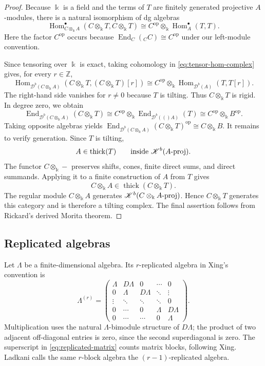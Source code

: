 \documentclass[12pt,a4paper,english,reqno]{amsart}
\theoremstyle{plain}
\theoremstyle{definition}
\newcommand{\kk}{\Bbbk}
\newcommand{\Hom}{\operatorname{Hom}}
\newcommand{\End}{\operatorname{End}}
\newcommand{\thick}{\operatorname{thick}}
\newcommand{\op}{\mathrm{op}}
\newcommand{\Db}[1]{{\mathscr D}^b(#1)}
\newcommand{\pmodcat}[1]{#1\mbox{{\rm -proj}}}
\newcommand{\Kb}[1]{{\mathscr K}^b(#1)}
\begin{document}
\begin{proof}
Because $\kk$ is a field and the terms of $T$ are finitely generated
projective $A$-modules, there is a natural isomorphism of dg algebras
\begin{equation}
 \Hom^\bullet_{C\otimes_{\kk}A}(C\otimes_{\kk}T,C\otimes_{\kk}T)
 \cong C^{\op}\otimes_{\kk}\Hom^\bullet_A(T,T).
\label{eq:tensor-hom-complex}
\end{equation}
Here the factor $C^{\op}$ occurs because
$\End_C({}_CC)\cong C^{\op}$ under our left-module convention.

Since tensoring over $\kk$ is exact, taking cohomology in
\eqref{eq:tensor-hom-complex} gives, for every $r\in\mathbb Z$,
\[
 \Hom_{\Db{C\otimes_{\kk}A}}(C\otimes_{\kk}T,(C\otimes_{\kk}T)[r])
 \cong C^{\op}\otimes_{\kk}\Hom_{\Db{A}}(T,T[r]).
\]
The right-hand side vanishes for $r\neq0$ because $T$ is tilting.
Thus $C\otimes_{\kk}T$ is rigid.  In degree zero, we obtain
\[
 \End_{\Db{C\otimes_{\kk}A}}(C\otimes_{\kk}T)
 \cong
 C^{\op}\otimes_{\kk}\End_{\Db(A)}(T)
 \cong
 C^{\op}\otimes_{\kk}B^{\op}.
\]
Taking opposite algebras yields $\End_{\Db{C\otimes_{\kk}A}}(C\otimes_{\kk}T)^{\op}
 \cong
 C\otimes_{\kk}B$.
It remains to verify generation.  Since $T$ is tilting,
\[
 A\in\thick(T)
 \qquad\text{inside }
 \Kb{\pmodcat{A}}.
\]
The functor $C\otimes_{\kk}-$ preserves shifts, cones, finite direct
sums, and direct summands.  Applying it to a finite construction of $A$
from $T$ gives
\[
 C\otimes_{\kk}A
 \in
 \thick(C\otimes_{\kk}T).
\]
The regular module $C\otimes_{\kk}A$ generates
$ \Kb{\pmodcat{C\otimes_{\kk}A}}$.
Hence $C\otimes_{\kk}T$ generates this category and is therefore a
tilting complex.  The final assertion follows from Rickard's derived
Morita theorem.
\end{proof}

\subsection{Replicated algebras}

Let $\Lambda$ be a finite-dimensional algebra.  Its $r$-replicated
algebra in Xing's convention is
\begin{equation}
 \Lambda^{(r)}
 =
 \begin{pmatrix}
  \Lambda&D\Lambda&0&\cdots&0\\
  0&\Lambda&D\Lambda&\ddots&\vdots\\
  \vdots&\ddots&\ddots&\ddots&0\\
  0&\cdots&0&\Lambda&D\Lambda\\
  0&\cdots&\cdots&0&\Lambda
 \end{pmatrix}.
\label{eq:replicated-matrix}
\end{equation}
Multiplication uses the natural $\Lambda$-bimodule structure of
$D\Lambda$; the product of two adjacent off-diagonal entries is zero,
since the second superdiagonal is zero.  The superscript in
\eqref{eq:replicated-matrix} counts matrix blocks, following Xing.
Ladkani calls the same $r$-block algebra the $(r-1)$-replicated algebra.
\end{document}
